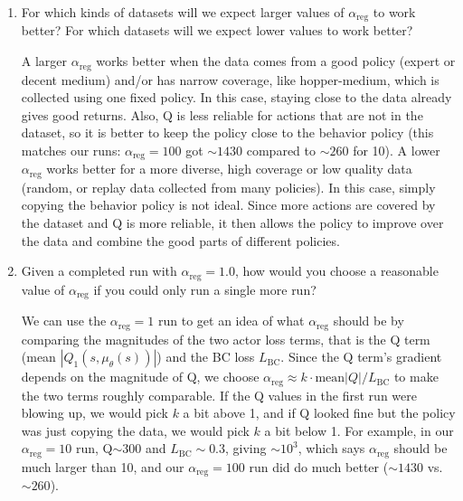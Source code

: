 \documentclass[11pt]{article}
\begin{document}
\begin{enumerate}
  \item For which kinds of datasets will we expect larger values of $\alpha_\text{reg}$ to work better? For which datasets will we expect lower values to work better?
  \begin{answer}[height=5cm]
    \small\setlength{\parskip}{2pt}
    A larger $\alpha_\text{reg}$ works better when the data comes from a good policy (expert or decent medium) and/or has narrow coverage, like hopper-medium, which is collected using one fixed policy. In this case, staying close to the data already gives good returns. Also, Q is less reliable for actions that are not in the dataset, so it is better to keep the policy close to the behavior policy (this matches our runs: $\alpha_\text{reg}=100$ got $\sim1430$ compared to $\sim260$ for 10). A lower $\alpha_\text{reg}$ works better for a more diverse, high coverage or low quality data (random, or replay data collected from many policies). In this case, simply copying the behavior policy is not ideal. Since more actions are covered by the dataset and Q is more reliable, it then allows the policy to improve over the data and combine the good parts of different policies.
  \end{answer}
  \item Given a completed run with $\alpha_\text{reg} = 1.0$, how would you choose a reasonable value of $\alpha_\text{reg}$ if you could only run a single more run?
  \begin{answer}[height=5cm]
    \small\setlength{\parskip}{2pt}
    We can use the $\alpha_\text{reg}=1$ run to get an idea of what $\alpha_\text{reg}$ should be by comparing the magnitudes of the two actor loss terms, that is the Q term (mean $|Q_1(s,\mu_\theta(s))|$) and the BC loss $L_\text{BC}$. Since the Q term's gradient depends on the magnitude of Q, we choose $\alpha_\text{reg}\approx k\cdot\text{mean}|Q|/L_\text{BC}$ to make the two terms roughly comparable. If the Q values in the first run were blowing up, we would pick $k$ a bit above 1, and if Q looked fine but the policy was just copying the data, we would pick $k$ a bit below 1. For example, in our $\alpha_\text{reg}=10$ run, Q$\sim300$ and $L_\text{BC}\sim0.3$, giving $\sim10^3$, which says $\alpha_\text{reg}$ should be much larger than 10, and our $\alpha_\text{reg}=100$ run did do much better ($\sim1430$ vs.\ $\sim260$).
  \end{answer}
\end{enumerate}
\end{document}
